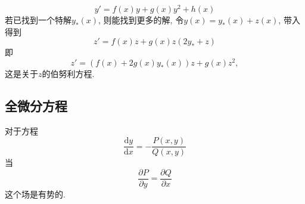 \begin{example}[Riccati方程]
  \begin{equation}
    y' = f(x)y + g(x) y^{2} + h(x)
  \end{equation}
  若已找到一个特解$y_{*}(x)$, 则能找到更多的解, 令$y(x) = y_{*}(x) + z(x)$, 带入得到
  \begin{equation}
    z' = f(x)z + g(x) z \left( 2y_{*} + z\right)
  \end{equation}
  即
  \begin{equation}
    z' = \left( f(x) + 2 g(x) y_{*}(x) \right)z + g(x)z^{2},
  \end{equation}
  这是关于$z$的伯努利方程.
\end{example}

\subsection{全微分方程}
对于方程
\begin{equation}
  \frac{\mathrm{d} y}{\mathrm{d} x} = - \frac{P(x,y)}{Q(x,y)}
\end{equation}
当
\begin{equation}
  \frac{\partial P}{\partial y} = \frac{\partial Q}{\partial x}
\end{equation}
这个场是有势的.
